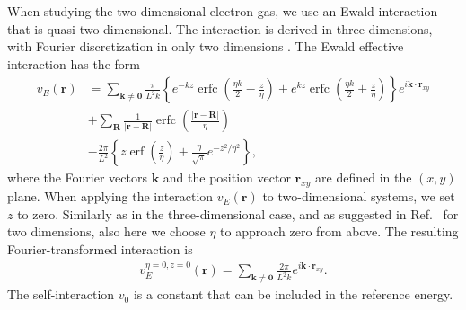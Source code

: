 \documentclass[a4paper,12pt]{report}
\DeclareMathOperator\erf{erf}
\DeclareMathOperator\erfc{erfc}
\begin{document}
When studying the two-dimensional electron gas, we
use an Ewald interaction that is quasi two-dimensional.
The interaction is derived in three dimensions, with 
Fourier discretization in only two dimensions 
\cite{parry1975,parry1976,wood2004}. The Ewald effective
interaction has the form \cite{wood2004}
\begin{align}
  v_{E}(\mathbf{r}) &= \sum_{\mathbf{k} \neq \mathbf{0}} 
  \frac{\pi }{L^{2}k}\left\{ e^{-kz} \erfc \left(
  \frac{\eta k}{2} - \frac{z}{\eta }\right)
  + e^{kz}\erfc \left( \frac{\eta k}{2} + \frac{z}{\eta }
  \right) \right\} e^{i\mathbf{k}\cdot \mathbf{r}_{xy}} 
  \nonumber \\
  & + \sum_{\mathbf{R}}\frac{1}{\left| \mathbf{r}-\mathbf{R}
    \right| } \erfc \left( \frac{\left| \mathbf{r}-\mathbf{R}
    \right|}{\eta }\right) \nonumber \\
  & - \frac{2\pi}{L^{2}}\left\{ z\erf \left( \frac{z}{\eta }
  \right) + \frac{\eta }{\sqrt{\pi }}e^{-z^{2}/\eta^{2}}\right\},
\end{align}
where the Fourier vectors $\mathbf{k}$ and the position vector
$\mathbf{r}_{xy}$ are defined in the $(x,y)$ plane. When
applying the interaction $v_{E}(\mathbf{r})$ to two-dimensional
systems, we set $z$ to zero. Similarly as in the 
three-dimensional case, and as suggested in 
Ref.~\cite{drummond2008} for two dimensions, also here we 
choose $\eta $ to approach zero from above. The resulting 
Fourier-transformed interaction is
\begin{align}
  v_{E}^{\eta = 0, z = 0}(\mathbf{r}) = \sum_{\mathbf{k} \neq \mathbf{0}} 
  \frac{2\pi }{L^{2}k}e^{i\mathbf{k}\cdot \mathbf{r}_{xy}}. 
\end{align}
The self-interaction $v_{0}$ is a constant that can be 
included in the reference energy.
\end{document}
